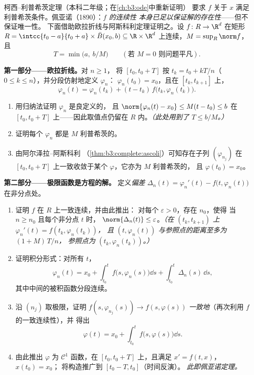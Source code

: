 \begin{problem}[{周末问题——无利普希茨条件时
$x' = f(t, x)$ 解的存在性}]\label{pb:b3:complete:1}
柯西–利普希茨定理（本科二年级；在\cref{ch:b3:ode}中重新证明）
要求 $f$ 关于 $x$ 满足利普希茨条件。佩亚诺（1890）：\emph{$f$ 的连续性
本身已足以保证解的存在性}——但不保证唯一性。
下面借助欧拉折线与阿斯科利定理证明之。设 $f \colon R
\to \R^d$ 在矩形 $R = \intcc{t_0 - a}{t_0
+ a}\times \bar B(x_0, b) \subseteq \R\times\R^d$ 上连续，$M =
\sup_R\norm f$，且
\[
T = \min\bigl(a,\ b/M\bigr)
\qquad (\text{若 } M = 0 \text{ 则问题平凡}).
\]

\medskip
\noindent\textbf{第一部分——欧拉折线。}对 $n \geq 1$，
将 $[t_0, t_0 + T]$ 按 $t_k = t_0 + kT/n$（$0 \leq k
\leq n$），并分段仿射地定义 $\varphi_n$：
$\varphi_n(t_0) = x_0$，且在 $[t_k, t_{k+1}]$ 上，
\[
\varphi_n(t) = \varphi_n(t_k) + (t -
t_k)\,f\bigl(t_k, \varphi_n(t_k)\bigr).
\]
\begin{enumerate}
  \item 用归纳法证明 $\varphi_n$ 是良定义的，
        且 $\norm{\varphi_n(t) - x_0} \leq M(t - t_0) \leq b$
        在 $[t_0, t_0 + T]$ 上——因此取值点仍留在
        $R$ 内。\emph{（此处用到了 $T \leq b/M$。）}
  \item 证明每个 $\varphi_n$ 都是 $M$ 利普希茨的。
  \item 由阿尔泽拉–阿斯科利
        （\cref{thm:b3:complete:ascoli}）可知存在子列
        $(\varphi_{n_j})$ 在 $[t_0, t_0 +
        T]$ 上一致收敛于某个 $\varphi$，它亦为 $M$ 利普希茨的，
        且 $\varphi(t_0) = x_0$。
\end{enumerate}

\medskip
\noindent\textbf{第二部分——极限函数是方程的解。}
定义\emph{偏差} $\Delta_n(t) = \varphi_n'(t) -
f\bigl(t, \varphi_n(t)\bigr)$ 在非分点处。
\begin{enumerate}[resume]
  \item 证明 $f$ 在 $R$ 上一致连续，并由此推出：
        对每个 $\varepsilon > 0$，存在 $n_0$，使得
        当 $n \geq n_0$ 且每个非分点 $t$ 时，
        $\norm{\Delta_n(t)} \leq \varepsilon$。\emph{（在 $(t_k,
        t_{k+1})$ 上 $\varphi_n'(t) = f(t_k, \varphi_n(t_k))$，
        且 $(t, \varphi_n(t))$ 与参照点的距离至多为 $(1 + M)\,T/n$，
        参照点为 $(t_k, \varphi_n(t_k))$。）}
  \item 证明积分形式：对所有 $t$，
        \[
        \varphi_n(t) = x_0 + \int_{t_0}^{t}
        f\bigl(s, \varphi_n(s)\bigr)\dd s +
        \int_{t_0}^t \Delta_n(s)\,\dd s,
        \]
        其中中间的被积函数分段连续。
  \item 沿 $(n_j)$ 取极限，证明
        $f(s, \varphi_{n_j}(s)) \to f(s, \varphi(s))$
        \emph{一致地}（再次利用 $f$ 的一致连续性），并
        得出
        \[
        \varphi(t) = x_0 + \int_{t_0}^t
        f\bigl(s, \varphi(s)\bigr)\dd s .
        \]
  \item 由此推出 $\varphi$ 为 $\mathcal C^1$ 函数，在 $[t_0, t_0 +
        T]$ 上，且满足 $x' = f(t, x)$，$x(t_0) = x_0$；
        将构造推广到 $[t_0 - T, t_0]$（时间反演）。
        \emph{此即佩亚诺定理。}
\end{enumerate}


\end{problem}
